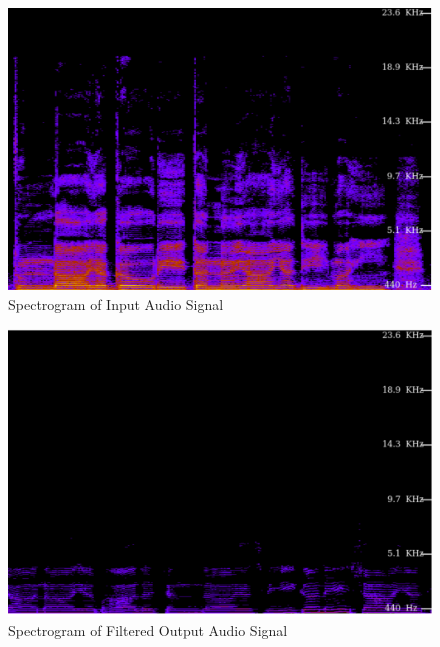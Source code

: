 \documentclass[journal,12pt,twocolumn]{IEEEtran}
\theoremstyle{remark}
\begin{document}
\begin{enumerate}[label=\thesection.\arabic*
,ref=\thesection.\theenumi]
\begin{figure}[!ht]
    \includegraphics[width=\columnwidth]{figs/input_signal.png}
    \caption{Spectrogram of Input Audio Signal}
    \label{fig:input_audio}
\end{figure}
\begin{figure}[!ht]
    \includegraphics[width=\columnwidth]{figs/output_signal.png}
    \caption{Spectrogram of Filtered Output Audio Signal}
    \label{fig:output_audio}
\end{figure}

\end{enumerate}
\end{document}

